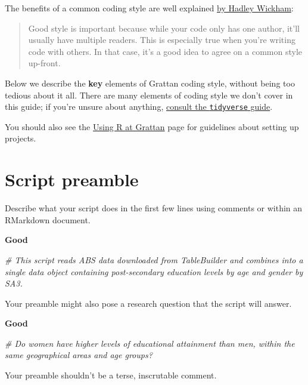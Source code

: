 \documentclass[]{book}
\newenvironment{Shaded}{\begin{snugshade}}{\end{snugshade}}
\newcommand{\CommentTok}[1]{\textcolor[rgb]{0.56,0.35,0.01}{\textit{#1}}}
\begin{document}
The benefits of a common coding style are well explained \href{http://r-pkgs.had.co.nz/style.html}{by Hadley Wickham}:

\begin{quote}
Good style is important because while your code only has one author, it'll usually have multiple readers. This is especially true when you're writing code with others. In that case, it's a good idea to agree on a common style up-front.
\end{quote}

Below we describe the \textbf{key} elements of Grattan coding style, without being too tedious about it all. There are many elements of coding style we don't cover in this guide; if you're unsure about anything, \href{https://style.tidyverse.org/}{consult the \texttt{tidyverse} guide}.

You should also see the \protect\hyperlink{organising-projects}{Using R at Grattan} page for guidelines about setting up projects.

\hypertarget{script-preamble}{%
\section{Script preamble}\label{script-preamble}}

Describe what your script does in the first few lines using comments or within an RMarkdown document.

\textbf{Good}

\begin{Shaded}
\begin{Highlighting}[]
\CommentTok{# This script reads ABS data downloaded from TableBuilder and combines into a single data object containing post-secondary education levels by age and gender by SA3. }
\end{Highlighting}
\end{Shaded}

Your preamble might also pose a research question that the script will answer.

\textbf{Good}

\begin{Shaded}
\begin{Highlighting}[]
\CommentTok{# Do women have higher levels of educational attainment than men, within the same geographical areas and age groups?}
\end{Highlighting}
\end{Shaded}

Your preamble shouldn't be a terse, inscrutable comment.
\end{document}
